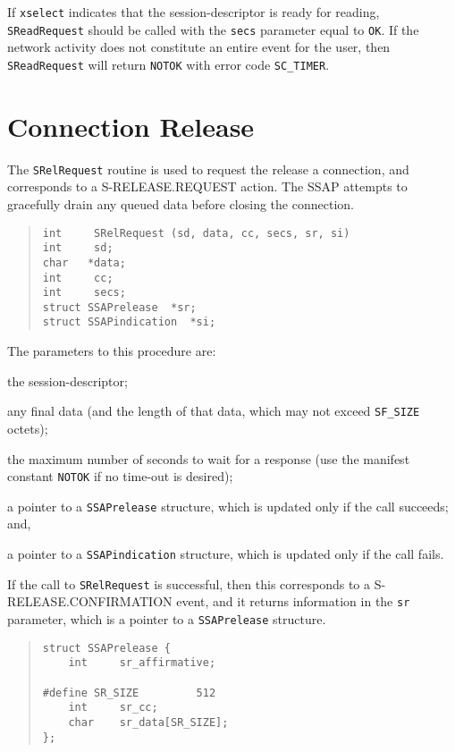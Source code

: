If \verb"xselect" indicates that the session-descriptor is ready for reading,
\verb"SReadRequest" should be called with the \verb"secs" parameter equal to
\verb"OK".
If the network activity does not constitute an entire event for the user,
then \verb"SReadRequest" will return \verb"NOTOK" with error code
\verb"SC_TIMER".

\section	{Connection Release}
The \verb"SRelRequest" routine is used to request the release a connection,
and corresponds to a {\sf S-RELEASE.REQUEST\/} action.
The SSAP attempts to gracefully drain any queued data before closing
the connection.
\begin{quote}\small\begin{verbatim}
int     SRelRequest (sd, data, cc, secs, sr, si)
int     sd;
char   *data;
int     cc;
int     secs;
struct SSAPrelease  *sr;
struct SSAPindication  *si;
\end{verbatim}\end{quote}
The parameters to this procedure are:
\begin{describe}
\item[\verb"sd":] the session-descriptor;

\item[\verb"data"/\verb"cc":] any final data
(and the length of that data,
which may not exceed \verb"SF_SIZE" octets);

\item[\verb"secs":] the maximum number of seconds to wait for a response
(use the manifest constant \verb"NOTOK" if no time-out is desired);

\item[\verb"sr":] a pointer to a \verb"SSAPrelease" structure, which is updated
only if the call succeeds;
and,

\item[\verb"si":] a pointer to a \verb"SSAPindication" structure, which is updated
only if the call fails.
\end{describe}
If the call to \verb"SRelRequest" is successful,
then this corresponds to a {\sf S-RELEASE.CONFIRMATION\/} event,
and it returns information in the \verb"sr" parameter,
which is a pointer to a \verb"SSAPrelease" structure.
\begin{quote}\small\begin{verbatim}
struct SSAPrelease {
    int     sr_affirmative;

#define SR_SIZE         512
    int     sr_cc;
    char    sr_data[SR_SIZE];
};
\end{verbatim}\end{quote}
